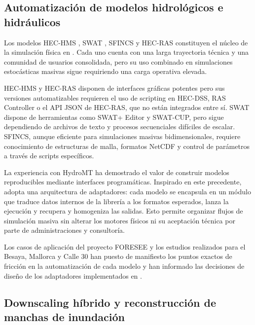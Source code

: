 \subsection{Automatización de modelos hidrológicos e hidráulicos}
\label{sec:automatización}

Los modelos HEC-HMS \parencite{scharffenberg2016hechms}, SWAT \parencite{arnold1998swat,gassman2007swat}, SFINCS \parencite{leijnse2021sfincs} y HEC-RAS \parencite{brunner2016hecras} constituyen el núcleo de la simulación física en \hydra. Cada uno cuenta con una larga trayectoria técnica y una comunidad de usuarios consolidada, pero su uso combinado en simulaciones estocásticas masivas sigue requiriendo una carga operativa elevada.

HEC-HMS y HEC-RAS disponen de interfaces gráficas potentes pero sus versiones automatizables requieren el uso de scripting en HEC-DSS, RAS Controller o el API JSON de HEC-RAS, que no están integrados entre sí. SWAT dispone de herramientas como SWAT+ Editor y SWAT-CUP, pero sigue dependiendo de archivos de texto y procesos secuenciales difíciles de escalar. SFINCS, aunque eficiente para simulaciones masivas bidimensionales, requiere conocimiento de estructuras de malla, formatos NetCDF y control de parámetros a través de scripts específicos.

La experiencia con HydroMT \parencite{eilander2023hydromt} ha demostrado el valor de construir modelos reproducibles mediante interfaces programáticas. Inspirado en este precedente, \hydra adopta una arquitectura de adaptadores: cada modelo se encapsula en un módulo que traduce datos internos de la librería a los formatos esperados, lanza la ejecución y recupera y homogeniza las salidas. Esto permite organizar flujos de simulación masiva sin alterar los motores físicos ni su aceptación técnica por parte de administraciones y consultoría.

Los casos de aplicación del proyecto FORESEE \parencite{ihcantabria2020foresee,ihcantabria2021m30} y los estudios realizados para el Besaya, Mallorca y Calle 30 \parencite{navas2018besaya,navas2019mallorca,navas2024calle30} han puesto de manifiesto los puntos exactos de fricción en la automatización de cada modelo y han informado las decisiones de diseño de los adaptadores implementados en \pyhydra.

\subsection{Downscaling híbrido y reconstrucción de manchas de inundación}
\label{sec:downscaling}

